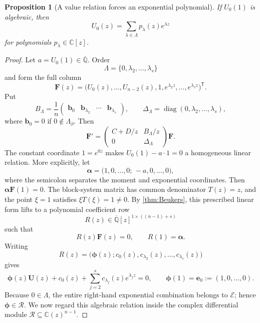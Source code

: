 \documentclass[11pt]{article}
\numberwithin{equation}{section}
\newtheorem{proposition}[proposition]{Proposition}
\theoremstyle{definition}
\theoremstyle{remark}
\newcommand{\C}{\mathbb C}
\newcommand{\Qbar}{\overline{\mathbb Q}}
\newcommand{\diag}{\operatorname{diag}}
\newcommand{\Ecal}{\mathcal E}
\newcommand{\Rcal}{\mathcal R}
\begin{document}
\begin{proposition}[A value relation forces an exponential polynomial]\label{prop:value-to-exp-poly}
If $U_0(1)$ is algebraic, then
\begin{equation}\label{eq:exp-polynomial-U0}
  U_0(z)=\sum_{\lambda\in\Lambda}p_\lambda(z)e^{\lambda z}
\end{equation}
for polynomials $p_\lambda\in\C[z]$.
\end{proposition}

\begin{proof}
Let $a=U_0(1)\in\Qbar$.  Order
\[
  \Lambda=\{0,\lambda_2,\ldots,\lambda_s\}
\]
and form the full column
\[
  \mathbf F(z)
  =\bigl(
     U_0(z),\ldots,U_{n-2}(z),
     1,e^{\lambda_2z},\ldots,e^{\lambda_sz}
   \bigr)^{\mathsf T}.
\]
Put
\[
  B_\Lambda=\frac1n
  \begin{pmatrix}
    \mathbf b_0&\mathbf b_{\lambda_2}&\cdots&\mathbf b_{\lambda_s}
  \end{pmatrix},
  \qquad
  \Delta_\Lambda=\diag(0,\lambda_2,\ldots,\lambda_s),
\]
where $\mathbf b_0=0$ if $0\notin\Lambda_\partial$.  Then
\[
  \mathbf F'
  =\begin{pmatrix}
      C+D/z&B_\Lambda/z\\
      0&\Delta_\Lambda
    \end{pmatrix}\mathbf F.
\]
The constant coordinate $1=e^{0z}$ makes
$U_0(1)-a\cdot1=0$ a homogeneous linear relation.  More explicitly, let
\[
  \boldsymbol\alpha
  =\bigl(1,0,\ldots,0;\,-a,0,\ldots,0\bigr),
\]
where the semicolon separates the moment and exponential coordinates.  Then
$\boldsymbol\alpha\mathbf F(1)=0$.  The block-system matrix has common
denominator $T(z)=z$, and the point $\xi=1$ satisfies
$\xi T(\xi)=1\ne0$.  By \cref{thm:Beukers}, this prescribed linear form lifts
to a polynomial coefficient row
\[
  R(z)\in\Qbar[z]^{1\times((n-1)+s)}
\]
such that
\[
  R(z)\mathbf F(z)=0,
  \qquad
  R(1)=\boldsymbol\alpha.
\]
Writing
\[
  R(z)=\bigl(
    \boldsymbol\phi(z);
    c_0(z),c_{\lambda_2}(z),\ldots,c_{\lambda_s}(z)
  \bigr)
\]
gives
\[
  \boldsymbol\phi(z)\mathbf U(z)
  +c_0(z)+\sum_{j=2}^s c_{\lambda_j}(z)e^{\lambda_jz}=0,
  \qquad
  \boldsymbol\phi(1)=\mathbf e_0:=(1,0,\ldots,0).
\]
Because $0\in\Lambda$, the entire right-hand exponential combination belongs
to $\Ecal$; hence $\boldsymbol\phi\in\Rcal$.  We now regard this algebraic
relation inside the complex differential module $\Rcal\subseteq\C(z)^{n-1}$.


\end{proof}
\end{document}
